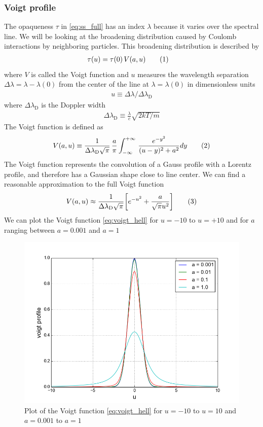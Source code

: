 \documentclass{article}
\newcommand\numberthis{\addtocounter{equation}{1}\tag{\theequation}}
\begin{document}
\subsubsection*{Voigt profile}
The opaqueness $\tau$ in \eqref{eq:ss_full} has an index $\lambda$ because it varies over the spectral line. We will be looking at the broadening distribution caused by Coulomb interactions by neighboring particles. This broadening distribution is described by
\begin{align*}
  \tau(u) &= \tau(0)\,V(a,u)\numberthis\label{eq:voigt}
\end{align*}
where $V$ is called the Voigt function and $u$ measures the wavelength separation $\Delta \lambda = \lambda-\lambda(0)$ from the center of the line at $\lambda=\lambda(0)$ in dimensionless units
\begin{align*}
  u \equiv \Delta\lambda/\Delta\lambda_{\text{D}}
\end{align*}
where $\Delta\lambda_{\text{D}}$ is the Doppler width
\begin{align*}
  \Delta\lambda_{\text{D}} \equiv\frac{\lambda}{c}\sqrt{2kT/m}
\end{align*}
The Voigt function is defined as
\begin{align*}
V(a,u)\equiv \frac{1}{\Delta\lambda_{\text{D}}\sqrt{\pi}}\,\frac{a}{\pi}\int_{-\infty}^{+\infty}\,\frac{e^{-y^2}}{(u-y)^2 + a^2}dy \numberthis\label{eq:voigt_hell}
\end{align*}
The Voigt function represents the convolution of a Gauss profile with a Lorentz profile, and therefore has a Gaussian shape close to line center. We can find a reasonable approximation to the full Voigt function
\begin{align*}
  V(a,u) \approx \frac{1}{\Delta\lambda_{\text{D}}\sqrt{\pi}}\bigg[e^{-u^2} + \frac{a}{\sqrt{\pi}u^2}\bigg] \numberthis\label{eq:voigt_approx}
\end{align*}
We can plot the Voigt function \eqref{eq:voigt_hell} for $u = -10$ to $u = +10$ and for $a$ ranging between $a=0.001$ and $a=1$ 
\begin{figure}[H]
  \centering
  \includegraphics[scale=0.5]{ssa_voigt.png}
  \caption{Plot of the Voigt function \eqref{eq:voigt_hell} for $u=-10$ to $u=10$ and $a=0.001$ to $a=1$}
  \label{fig:voigt}
\end{figure}
\end{document}
